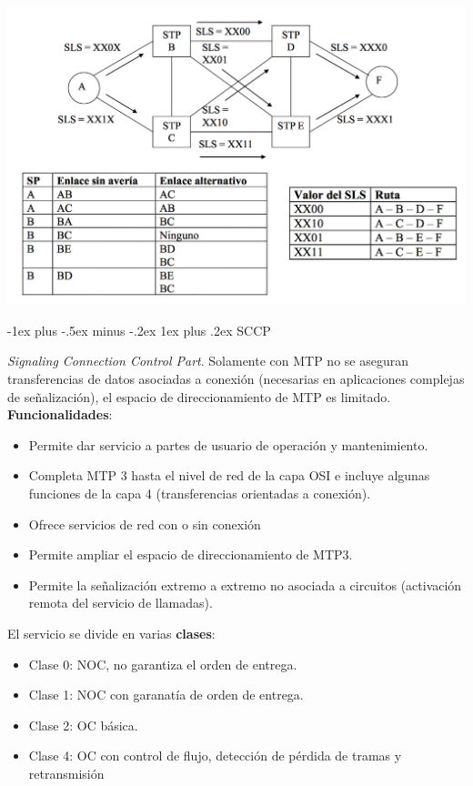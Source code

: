 \documentclass[10pt,portrait, twocolumn]{article}
\makeatletter
\renewcommand{\subsubsection}{\@startsection{subsubsection}{3}{0mm}%
                                {-1ex plus -.5ex minus -.2ex}%
                                {1ex plus .2ex}%
                                {\normalfont\small\bfseries}}
\makeatother
\begin{document}
	\begin{center}
		\includegraphics[scale = 0.3]{MTP3Ej}
	\end{center}	
	
\subsubsection{SCCP}

\textit{Signaling Connection Control Part}. Solamente con MTP  no se aseguran transferencias de datos asociadas a conexión (necesarias en aplicaciones complejas de señalización), el espacio de direccionamiento de MTP es limitado. \textbf{Funcionalidades}:

	\begin{itemize}
		\item Permite dar servicio a partes de usuario de operación y mantenimiento.
		\item Completa MTP 3 hasta el nivel de red de la capa OSI e incluye algunas funciones de la capa 4 (transferencias orientadas a conexión).
		\item Ofrece servicios de red con o sin conexión
		\item Permite ampliar el espacio de direccionamiento de MTP3.
		\item Permite la señalización extremo a extremo no asociada a circuitos (activación remota del servicio de llamadas).
	\end{itemize}

El servicio se divide en varias \textbf{clases}:

	\begin{itemize}
		\item Clase 0: NOC, no garantiza el orden de entrega.
		\item Clase 1: NOC con garanatía de orden de entrega.
		\item Clase 2: OC básica.
		\item Clase 4: OC con control de flujo, detección de pérdida de tramas y retransmisión
	\end{itemize}
	
\end{document}
